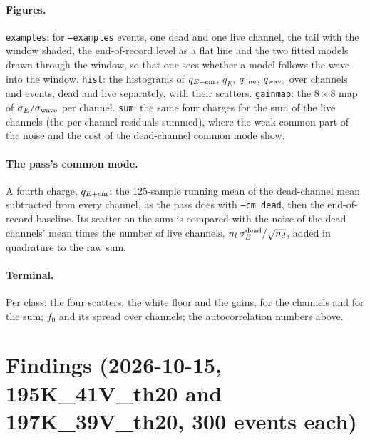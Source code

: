 \documentclass[11pt]{article}
\newcommand{\code}[1]{\texttt{#1}}
\begin{document}
\paragraph{Figures.} \code{examples}: for \code{--examples} events, one
dead and one live channel, the tail with the window shaded, the
end-of-record level as a flat line and the two fitted models drawn
through the window, so that one sees whether a model follows the wave
into the window. \code{hist}: the histograms of $q_{E+\rm cm}$, $q_E$, $q_{\rm line}$,
$q_{\rm wave}$ over channels and events, dead and live separately, with
their scatters. \code{gainmap}: the $8\times8$ map of
$\sigma_E / \sigma_{\rm wave}$ per channel. \code{sum}: the same four
charges for the sum of the live channels (the per-channel residuals
summed), where the weak common part of the noise and the cost of the
dead-channel common mode show.

\paragraph{The pass's common mode.} A fourth charge, $q_{E+\rm cm}$: the
125-sample running mean of the dead-channel mean subtracted from every
channel, as the pass does with \code{--cm dead}, then the end-of-record
baseline. Its scatter on the sum is compared with the noise of the dead
channels' mean times the number of live channels, $n_l\,\sigma_E^{\rm
dead}/\sqrt{n_d}$, added in quadrature to the raw sum.

\paragraph{Terminal.} Per class: the four scatters, the white floor and
the gains, for the channels and for the sum; $f_0$ and its spread
over channels; the autocorrelation numbers above.

\section{Findings (2026-10-15, 195K\_41V\_th20 and 197K\_39V\_th20, 300 events each)}
\end{document}

